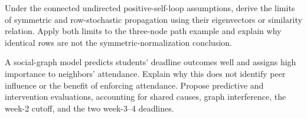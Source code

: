 \begin{challengeexercises}
\item {}Under the connected undirected positive-self-loop assumptions, derive the limits of symmetric and row-stochastic propagation using their eigenvectors or similarity relation. Apply both limits to the three-node path example and explain why identical rows are not the symmetric-normalization conclusion.
\item {}A social-graph model predicts students' deadline outcomes well and assigns high importance to neighbors' attendance. Explain why this does not identify peer influence or the benefit of enforcing attendance. Propose predictive and intervention evaluations, accounting for shared causes, graph interference, the week-2 cutoff, and the two week-3--4 deadlines.
\end{challengeexercises}

\clearpage
\begingroup\pagestyle{empty}\cleardoublepage\endgroup
\endgroup
